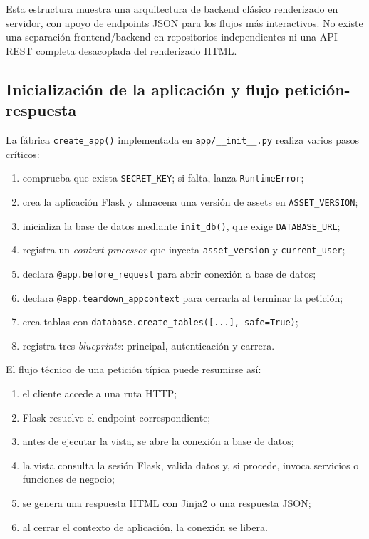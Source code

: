 Esta estructura muestra una arquitectura de backend clásico renderizado en servidor, con apoyo de endpoints JSON para los flujos más interactivos. No existe una separación frontend/backend en repositorios independientes ni una API REST completa desacoplada del renderizado HTML.

\subsection{Inicialización de la aplicación y flujo petición-respuesta}

La fábrica \texttt{create\_app()} implementada en \texttt{app/\_\_init\_\_.py} realiza varios pasos críticos:

\begin{enumerate}
    \item comprueba que exista \texttt{SECRET\_KEY}; si falta, lanza \texttt{RuntimeError};
    \item crea la aplicación Flask y almacena una versión de assets en \texttt{ASSET\_VERSION};
    \item inicializa la base de datos mediante \texttt{init\_db()}, que exige \texttt{DATABASE\_URL};
    \item registra un \textit{context processor} que inyecta \texttt{asset\_version} y \texttt{current\_user};
    \item declara \texttt{@app.before\_request} para abrir conexión a base de datos;
    \item declara \texttt{@app.teardown\_appcontext} para cerrarla al terminar la petición;
    \item crea tablas con \texttt{database.create\_tables([...], safe=True)};
    \item registra tres \textit{blueprints}: principal, autenticación y carrera.
\end{enumerate}

El flujo técnico de una petición típica puede resumirse así:

\begin{enumerate}
    \item el cliente accede a una ruta HTTP;
    \item Flask resuelve el endpoint correspondiente;
    \item antes de ejecutar la vista, se abre la conexión a base de datos;
    \item la vista consulta la sesión Flask, valida datos y, si procede, invoca servicios o funciones de negocio;
    \item se genera una respuesta HTML con Jinja2 o una respuesta JSON;
    \item al cerrar el contexto de aplicación, la conexión se libera.
\end{enumerate}

